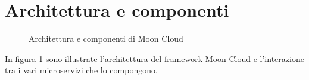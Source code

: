 \documentclass[../main.tex]{subfiles}
\begin{document}
\section{Architettura e componenti}
\begin{figure}[H]
\centering
{}
\caption{Architettura e componenti di Moon Cloud}\label{fig:MCArchi}
\end{figure}
In figura \ref{fig:MCArchi} sono illustrate l'architettura del framework Moon Cloud e l'interazione tra i vari microservizi che lo compongono.
\end{document}
